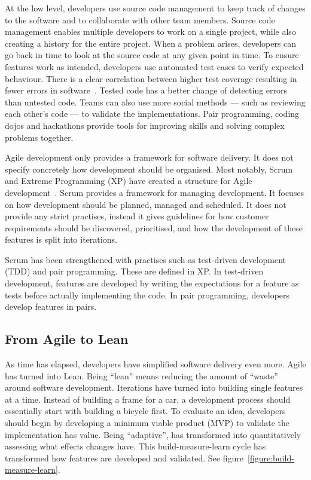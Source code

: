 \documentclass[english]{tktltiki2}
\begin{document}
At the low level, developers use source code management to keep track of changes to the software and to collaborate with other team members. Source code management enables multiple developers to work on a single project, while also creating a history for the entire project. When a problem arises, developers can go back in time to look at the source code at any given point in time. To ensure features work as intended, developers use automated test cases to verify expected behaviour. There is a clear correlation between higher test coverage resulting in fewer errors in software~\cite{MND09}. Tested code has a better change of detecting errors than untested code. Teams can also use more social methods — such as reviewing each other’s code — to validate the implementations. Pair programming, coding dojos and hackathons provide tools for improving skills and solving complex problems together.

Agile development only provides a framework for software delivery. It does not specify concretely how development should be organised. Most notably, Scrum and Extreme Programming (XP) have created a structure for Agile development~\cite{LB03, SS10}. Scrum provides a framework for managing development. It focuses on how development should be planned, managed and scheduled. It does not provide any strict practises, instead it gives guidelines for how customer requirements should be discovered, prioritised, and how the development of these features is split into iterations.

Scrum has been strengthened with practises such as test-driven development (TDD) and pair programming. These are defined in XP. In test-driven development, features are developed by writing the expectations for a feature as tests before actually implementing the code. In pair programming, developers develop features in pairs.

\subsection{From Agile to Lean}

As time has elapsed, developers have simplified software delivery even more. Agile has turned into Lean. Being “lean” means reducing the amount of “waste” around software development. Iterations have turned into building single features at a time. Instead of building a frame for a car, a development process should essentially start with building a bicycle first. To evaluate an idea, developers should begin by developing a minimum viable product (MVP) to validate the implementation has value. Being “adaptive”, has transformed into quantitatively assessing what effects changes have. This build-measure-learn cycle has transformed how features are developed and validated. See figure~\ref{figure:build-measure-learn}.
\end{document}
